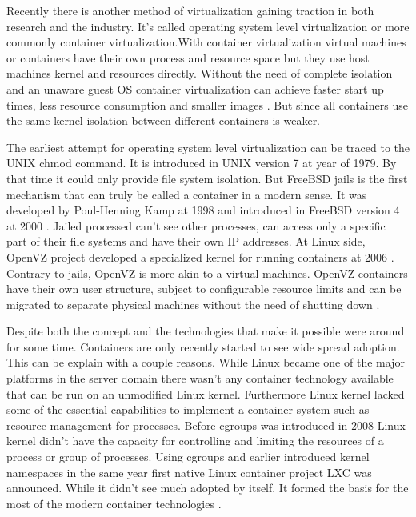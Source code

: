 \documentclass[12pt,oneandhalf,chaparabic,ceng,ms,eng,oneside,pntc]{gsufbe}
\begin{document}
Recently there is another method of virtualization gaining traction in both research and the industry.
It's called operating system level virtualization or more commonly container virtualization.With
container virtualization virtual machines or containers have their own process and resource space but
they use host machines kernel and resources directly.  Without the need of complete isolation and an
unaware guest OS container virtualization can achieve faster start up times, less resource consumption
and smaller images \cite{joy_performance_2015}.  But since all containers use the same kernel isolation
between different containers is weaker.

The earliest attempt for operating system level virtualization can be traced to the UNIX chmod command.
It is introduced in UNIX version 7 at year of 1979.  By that time it could only provide file system
isolation.  But FreeBSD jails is the first mechanism that can truly be called a container in a modern
sense.  It was developed by Poul-Henning Kamp at 1998 and introduced in FreeBSD version 4 at 2000 
\cite{kamp_jails_2000}.
Jailed processed can't see other processes, can access only a specific part of their file systems and
have their own IP addresses.  At Linux side, OpenVZ project developed a specialized kernel for running
containers at 2006 \cite{kolyshkin_virtualization_2006}.  Contrary to jails, OpenVZ is more akin to a
virtual machines.  OpenVZ containers
have their own user structure, subject to configurable resource limits and can be migrated to separate
physical machines without the need of shutting down \cite{bernstein_containers_2014}.

Despite both the concept and the technologies that make it possible were around for some time.
Containers are only recently started to see wide spread adoption.  This can be explain with a couple
reasons.  While Linux became one of the major platforms in the server domain there wasn't any container
technology available that can be run on an unmodified Linux kernel.  Furthermore Linux kernel lacked
some of the essential capabilities to implement a container system such as resource management for
processes.  Before cgroups was introduced in 2008 Linux kernel didn't have the capacity for controlling
and limiting the resources of a process or group of processes.  Using cgroups and earlier introduced
kernel namespaces in the same year first native Linux
container project LXC \cite{lxc} was announced.  While it didn't see much adopted by itself.  It formed
the basis
for the most of the modern container technologies \cite{singh_containers_2016}.
\end{document}
